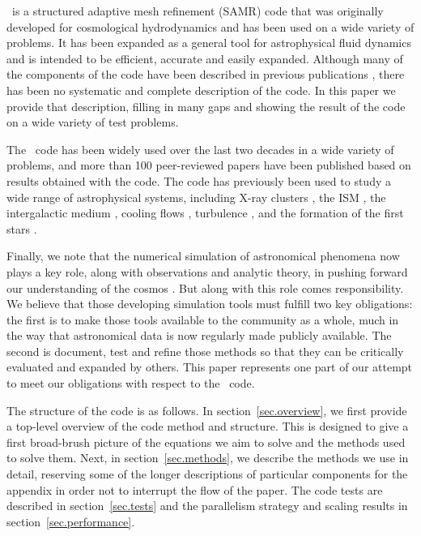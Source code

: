\enzo\ is a structured adaptive mesh refinement (SAMR) code that was originally developed for cosmological hydrodynamics and has been used on a wide variety of problems.  It has been expanded as a general tool for astrophysical fluid dynamics and is intended to be efficient, accurate and easily expanded.  Although many of the components of the code have been described in previous publications \citep{1995CoPhC..89..149B, BryanThesis96, Bryan97a, Bryan97b, Norman99, BryanCompSci99, Bryan01, Oshea04}, there has been no systematic and complete description of the code.  In this paper we provide that description, filling in many gaps and showing the result of the code on a wide variety of test problems.

The \enzo\ code has been widely used over the last two decades in a wide variety of problems, and more than 100 peer-reviewed papers have been published based on results obtained with the code.  The code has previously been used to study a wide range of astrophysical systems, including X-ray clusters \citep{Loken02}, the ISM \citep{Slyz05}, the intergalactic medium \citep{Fang01}, cooling flows \citep{Li12}, turbulence \citep{Kritsuk04}, and the formation of the first stars \citep{ABN02}.

Finally, we note that the numerical simulation of astronomical phenomena now plays a key role, along with observations and analytic theory, in pushing forward our understanding of the cosmos \citep[e.g.,][]{DecadalSurvey01, DecadalSurvey10}.   But along with this role comes responsibility.  We believe that those developing simulation tools must fulfill two key obligations: the first is to make those tools available to the community as a whole, much in the way that astronomical data is now regularly made publicly available.  The second is document, test and refine those methods so that they can be critically evaluated and expanded by others.  This paper represents one part of our attempt to meet our obligations with respect to the \enzo\ code.

The structure of the code is as follows.  In section~\ref{sec.overview}, we first provide a top-level overview of the code method and structure.  This is designed to give a first broad-brush picture of the equations we aim to solve and the methods used to solve them.  Next, in section~\ref{sec.methods}, we describe the methods we use in detail, reserving some of the longer descriptions of particular components for the appendix in order not to interrupt the flow of the paper.  The code tests are described in section~\ref{sec.tests} and the parallelism strategy and scaling results in section~\ref{sec.performance}.

